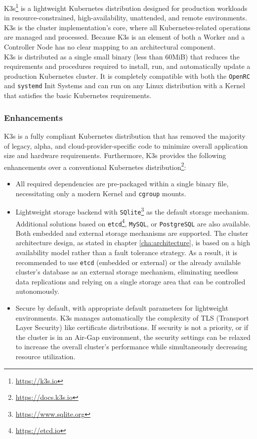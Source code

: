 K3s\footnote{\url{https://k3s.io}} is a lightweight Kubernetes distribution
designed for production workloads in resource-constrained, high-availability,
unattended, and remote environments. K3s is the cluster implementation's core, where
all Kubernetes-related operations are managed and processed. Because K3s is an
element of both a Worker and a Controller Node has no clear mapping to an
architectural component. \\ %
K3s is distributed as a single small binary (less than 60MiB) that reduces the
requirements and procedures required to install, run, and automatically update a
production Kubernetes cluster. It is completely compatible with both the \texttt{OpenRC}
and \texttt{systemd} Init Systems and can run on any Linux distribution with a Kernel
that satisfies the basic Kubernetes requirements.

\subsubsection{Enhancements}
\label{subsubsec:implementation_dependencies_k3s_enhancements}

K3s is a fully compliant Kubernetes distribution that has removed the majority
of legacy, alpha, and cloud-provider-specific code to minimize overall
application size and hardware requirements. Furthermore, K3s provides the
following enhancements over a conventional Kubernetes distribution\footnote{\url{https://docs.k3s.io}}:
\begin{itemize}
  \item All required dependencies are pre-packaged within a single binary file,
    necessitating only a modern Kernel and \texttt{cgroup} mounts.

  \item Lightweight storage backend with \texttt{SQlite}\footnote{\url{https://www.sqlite.org}}
    as the default storage mechanism. Additional solutions based on \texttt{etcd}\footnote{\url{https://etcd.io}},
    \texttt{MySQL}, or \texttt{PostgreSQL} are also available. Both embedded and
    external storage mechanisms are supported.
    \newline
    The cluster architecture design, as stated in chapter \ref{cha:architecture},
    is based on a high availability model rather than a fault tolerance strategy.
    As a result, it is recommended to use \texttt{etcd} (embedded or external) or
    the already available cluster's database as an external storage mechanism,
    eliminating needless data replications and relying on a single storage area
    that can be controlled autonomously.

  \item Secure by default, with appropriate default parameters for lightweight
    environments. K3s manages automatically the complexity of TLS (Transport
    Layer Security) like certificate distributions.
    \newline
    If security is not a priority, or if the cluster is in an Air-Gap environment,
    the security settings can be relaxed to increase the overall cluster's
    performance while simultaneously decreasing resource utilization.
\end{itemize}

